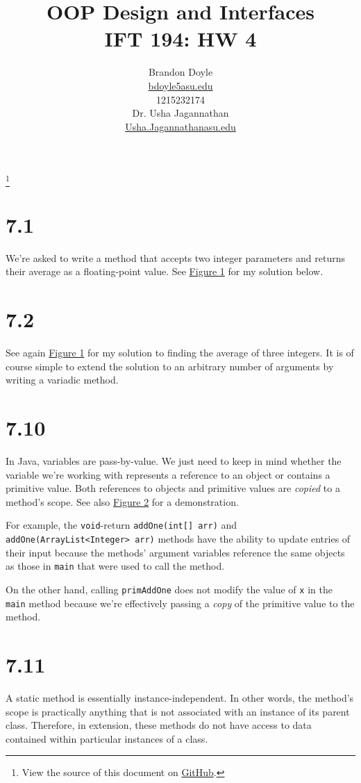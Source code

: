 \documentclass[leqno, 11pt]{article}
\title{\vspace{6ex}OOP Design and Interfaces\\
  \Large IFT 194: HW 4}
\author{Brandon Doyle\\
\href{mailto:bdoyle@asu.edu}{bdoyle5\at{}asu.edu}\\
1215232174\\[1em]
Dr. Usha Jagannathan\\
\href{mailto:Usha.Jagannathan@asu.edu}{Usha.Jagannathan\at{}asu.edu}}
\newcommand\blfootnote[1]{%
  \begingroup
    \renewcommand\thefootnote{}\footnote{#1}
    \addtocounter{footnote}{-1}
  \endgroup
}
\newcommand{\iftcodefigure}[3]{%
  \begin{codefigure}
    \label{#1}
    \addtocounter{figure}{-1}
    
  \end{codefigure}
}
\begin{document}
\begin{titlepage}
\clearpage\maketitle
\thispagestyle{empty}
\end{titlepage}
\tableofcontents
\blfootnote{View the source of this document on \href{https://github.com/bjd2385/IFT_194_labs/blob/master/\jobname.tex}{GitHub}.}
\newpage
\section{7.1}
We're asked to write a method that accepts two integer parameters and returns their average as a floating-point value. See \hyperref[fig:one]{Figure 1} for my solution below.
\iftcodefigure{fig:one}{Average2.java}{%
  /home/brandon/eclipse-workspace/ift_194_hw/src/hw_4/Average2.java}
\section{7.2}
See again \hyperref[fig:one]{Figure 1} for my solution to finding the average of three integers. It is of course simple to extend the solution to an arbitrary number of arguments by writing a variadic method.
\section{7.10}
In Java, variables are pass-by-value. We just need to keep in mind whether the variable we're working with represents a reference to an object or contains a primitive value. Both references to objects and primitive values are \textit{copied} to a method's scope. See also \hyperref[fig:two]{Figure 2} for a demonstration.

For example, the \texttt{void}-return \texttt{addOne(int[] arr)} and \texttt{addOne(ArrayList<Integer> arr)} methods have the ability to update entries of their input because the methods' argument variables reference the same objects as those in \texttt{main} that were used to call the method.

On the other hand, calling \texttt{primAddOne} does not modify the value of \texttt{x} in the \texttt{main} method because we're effectively passing a \textit{copy} of the primitive value to the method.
\iftcodefigure{fig:two}{ArgumentDifferences.java}{%
  /home/brandon/eclipse-workspace/ift_194_hw/src/hw_4/ArgumentDifferences.java}
\section{7.11}
A static method is essentially instance-independent. In other words, the method's scope is practically anything that is not associated with an instance of its parent class. Therefore, in extension, these methods do not have access to data contained within particular instances of a class.
\end{document}
